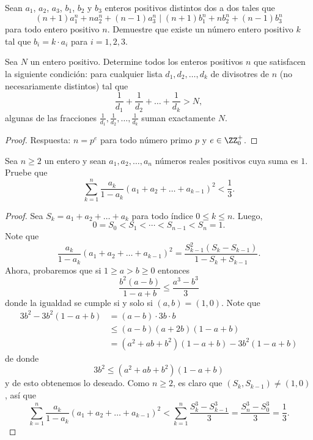 \begin{probMR}
	Sean $a_1$, $a_2$, $a_3$, $b_1$, $b_2$ y $b_3$ enteros positivos distintos dos a dos tales que
	\[(n+1)a_1^n+na_2^n+(n-1)a_3^n\mid(n+1)b_1^n+nb_2^n+(n-1)b_3^n\]
	para todo entero positivo $n$. Demuestre que existe un número entero positivo $k$ tal que $b_i=k\cdot a_i$ para $i=1,2,3$.
\end{probMR}


\begin{probEG}
	Sea $N$ un entero positivo. Determine todos los enteros positivos $n$ que satisfacen la siguiente condición: para cualquier lista $d_1,d_2,\dots,d_k$ de divisotres de $n$ (no necesariamente distintos) tal que
	\[\frac{1}{d_1}+\frac{1}{d_2}+\dots+\frac{1}{d_k}>N,\]
	algunas de las fracciones $\frac{1}{d_1},\frac{1}{d_2},\dots,\frac{1}{d_k}$ suman exactamente $N$.
\end{probEG}

\begin{proof}
	Respuesta: $n=p^e$ para todo número primo $p$ y $e\in\ZZ^+_0$.
\end{proof}

\begin{probHB}
	Sea $n\ge 2$ un entero y sean $a_1,a_2,\dots,a_n$ números reales positivos cuya suma es $1$. Pruebe que
	\[\sum_{k=1}^n\frac{a_k}{1-a_k}(a_1+a_2+\dots+a_{k-1})^2<\frac13.\]
\end{probHB}

\begin{proof}
	Sea $S_k=a_1+a_2+\dots+a_k$ para todo índice $0\le k\le n$. Luego,
	\[0=S_0<S_1<\cdots<S_{n-1}<S_n=1.\]
	Note que
	\[\frac{a_k}{1-a_k}(a_1+a_2+\dots+a_{k-1})^2=\frac{S_{k-1}^2(S_k-S_{k-1})}{1-S_k+S_{k-1}}.\]
	Ahora, probaremos que si $1\ge a>b\ge 0$ entonces
	\[\frac{b^2(a-b)}{1-a+b}\le\frac{a^3-b^3}{3}\]
	donde la igualdad se cumple si y solo si $(a,b)=(1,0)$. Note que
	\begin{align*}
		3b^2-3b^2(1-a+b)
		&=(a-b)\cdot 3b\cdot b\\
		&\le(a-b)(a+2b)(1-a+b)\\
		&=(a^2+ab+b^2)(1-a+b)-3b^2(1-a+b)
	\end{align*}
	de donde
	\[3b^2\le(a^2+ab+b^2)(1-a+b)\]
	y de esto obtenemos lo deseado. Como $n\ge 2$, es claro que $(S_k,S_{k-1})\ne(1,0)$, así que
	\[\sum_{k=1}^n\frac{a_k}{1-a_k}(a_1+a_2+\dots+a_{k-1})^2<\sum_{k=1}^n\frac{S_k^3-S_{k-1}^3}{3}=\frac{S_n^3-S_0^3}{3}=\frac13.\]
\end{proof}

